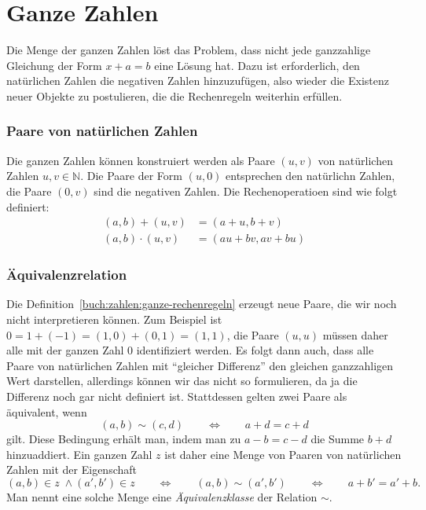 %
%
%
\section{Ganze Zahlen
\label{buch:section:ganze-zahlen}}
Die Menge der ganzen Zahlen löst das Problem, dass nicht jede ganzzahlige
Gleichung der Form $x+a=b$ eine Lösung hat.
Dazu ist erforderlich, den natürlichen Zahlen die negativen Zahlen
hinzuzufügen, also wieder die Existenz neuer Objekte zu postulieren,
die die Rechenregeln weiterhin erfüllen.

\subsubsection{Paare von natürlichen Zahlen}
Die ganzen Zahlen können konstruiert werden als Paare $(u,v)$ von 
natürlichen Zahlen $u,v\in\mathbb{N}$.
Die Paare der Form $(u,0)$ entsprechen den natürlichn Zahlen, die
Paare $(0,v)$ sind die negativen Zahlen.
Die Rechenoperatioen sind wie folgt definiert:
\begin{equation}
\begin{aligned}
(a,b)+(u,v) &= (a+u,b+v)
\\
(a,b)\cdot (u,v) &= (au+bv,av+bu)
\end{aligned}
\label{buch:zahlen:ganze-rechenregeln}
\end{equation}

\subsubsection{Äquivalenzrelation}
Die Definition~\eqref{buch:zahlen:ganze-rechenregeln}
erzeugt neue Paare, die wir noch nicht interpretieren können.
Zum Beispiel ist $0=1+(-1) = (1,0) + (0,1) = (1,1)$, die Paare $(u,u)$ 
müssen daher alle mit der ganzen Zahl $0$ identifiziert werden.
Es folgt dann auch, dass alle Paare von natürlichen Zahlen mit 
``gleicher Differenz'' den gleichen ganzzahligen Wert darstellen,
allerdings können wir das nicht so formulieren, da ja die Differenz
noch gar nicht definiert ist.
Stattdessen gelten zwei Paare als äquivalent, wenn
\begin{equation}
(a,b) \sim (c,d)
\qquad\Leftrightarrow\qquad
a+d = c+d
\label{buch:zahlen:ganz-aquivalenz}
\end{equation}
gilt.
Diese Bedingung erhält man, indem man zu $a-b=c-d$ die Summe $b+d$ 
hinzuaddiert.
Ein ganzen Zahl $z$ ist daher eine Menge von Paaren von natürlichen
Zahlen mit der Eigenschaft
\[
(a,b)\in z\;\wedge (a',b')\in z
\qquad\Leftrightarrow\qquad
(a,b)\sim(a',b')
\qquad\Leftrightarrow\qquad
a+b' = a'+b.
\]
Man nennt eine solche Menge eine {\em Äquivalenzklasse} der Relation $\sim$.


